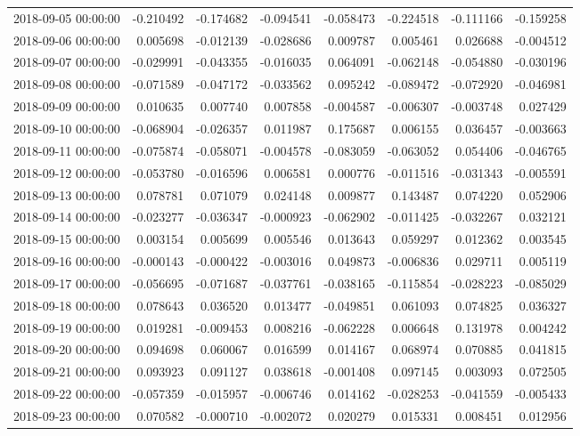 \begin{tabular}{lrrrrrrr}
2018-09-05 00:00:00 & -0.210492 & -0.174682 & -0.094541 & -0.058473 & -0.224518 & -0.111166 & -0.159258 \\
2018-09-06 00:00:00 & 0.005698 & -0.012139 & -0.028686 & 0.009787 & 0.005461 & 0.026688 & -0.004512 \\
2018-09-07 00:00:00 & -0.029991 & -0.043355 & -0.016035 & 0.064091 & -0.062148 & -0.054880 & -0.030196 \\
2018-09-08 00:00:00 & -0.071589 & -0.047172 & -0.033562 & 0.095242 & -0.089472 & -0.072920 & -0.046981 \\
2018-09-09 00:00:00 & 0.010635 & 0.007740 & 0.007858 & -0.004587 & -0.006307 & -0.003748 & 0.027429 \\
2018-09-10 00:00:00 & -0.068904 & -0.026357 & 0.011987 & 0.175687 & 0.006155 & 0.036457 & -0.003663 \\
2018-09-11 00:00:00 & -0.075874 & -0.058071 & -0.004578 & -0.083059 & -0.063052 & 0.054406 & -0.046765 \\
2018-09-12 00:00:00 & -0.053780 & -0.016596 & 0.006581 & 0.000776 & -0.011516 & -0.031343 & -0.005591 \\
2018-09-13 00:00:00 & 0.078781 & 0.071079 & 0.024148 & 0.009877 & 0.143487 & 0.074220 & 0.052906 \\
2018-09-14 00:00:00 & -0.023277 & -0.036347 & -0.000923 & -0.062902 & -0.011425 & -0.032267 & 0.032121 \\
2018-09-15 00:00:00 & 0.003154 & 0.005699 & 0.005546 & 0.013643 & 0.059297 & 0.012362 & 0.003545 \\
2018-09-16 00:00:00 & -0.000143 & -0.000422 & -0.003016 & 0.049873 & -0.006836 & 0.029711 & 0.005119 \\
2018-09-17 00:00:00 & -0.056695 & -0.071687 & -0.037761 & -0.038165 & -0.115854 & -0.028223 & -0.085029 \\
2018-09-18 00:00:00 & 0.078643 & 0.036520 & 0.013477 & -0.049851 & 0.061093 & 0.074825 & 0.036327 \\
2018-09-19 00:00:00 & 0.019281 & -0.009453 & 0.008216 & -0.062228 & 0.006648 & 0.131978 & 0.004242 \\
2018-09-20 00:00:00 & 0.094698 & 0.060067 & 0.016599 & 0.014167 & 0.068974 & 0.070885 & 0.041815 \\
2018-09-21 00:00:00 & 0.093923 & 0.091127 & 0.038618 & -0.001408 & 0.097145 & 0.003093 & 0.072505 \\
2018-09-22 00:00:00 & -0.057359 & -0.015957 & -0.006746 & 0.014162 & -0.028253 & -0.041559 & -0.005433 \\
2018-09-23 00:00:00 & 0.070582 & -0.000710 & -0.002072 & 0.020279 & 0.015331 & 0.008451 & 0.012956 \\

\end{tabular}
